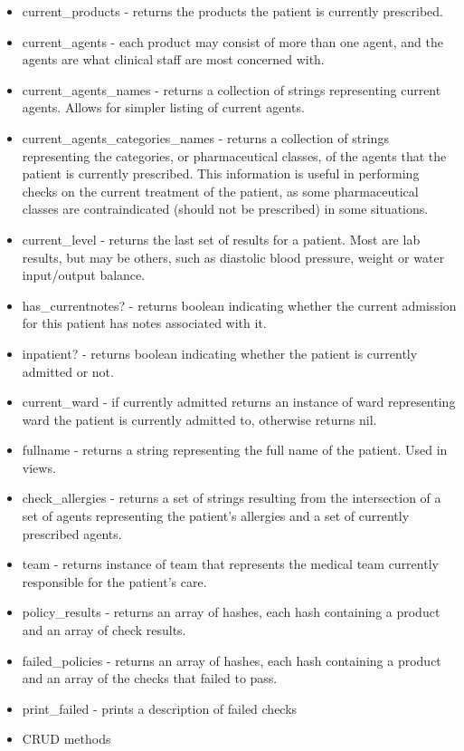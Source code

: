 \documentclass[letterpaper]{amsart}
\begin{document}
\begin{itemize}
    \item current\_products - returns the products the patient is currently prescribed. 
    \item current\_agents  - each product may consist of more than one agent, and the agents are what clinical staff are most concerned with.
    \item current\_agents\_names - returns a collection of strings representing current agents.  Allows for simpler listing of current agents. 
    \item current\_agents\_categories\_names - returns a collection of strings representing the categories, or pharmaceutical classes, of the agents that the patient is currently prescribed.  This information is useful in performing checks on the current treatment of the patient, as some pharmaceutical classes are contraindicated (should not be prescribed) in some situations. 
    \item current\_level - returns the last set of results for a patient.  Most are lab results, but may be others, such as diastolic blood pressure, weight or water input/output balance. 
    \item has\_currentnotes? - returns boolean indicating whether the current admission for this patient has notes associated with it. 
    \item inpatient? - returns boolean indicating whether the patient is currently admitted or not. 
    \item current\_ward - if currently admitted returns an instance of ward representing ward the patient is currently admitted to, otherwise returns nil. 
    \item fullname - returns a string representing the full name of the patient.  Used in views. 
    \item check\_allergies - returns a set of strings resulting from the intersection of a set of agents representing the patient's allergies and a set of currently prescribed agents.
    \item team - returns instance of team that represents the medical team currently responsible for the patient's care. 
    \item policy\_results - returns an array of hashes, each hash containing a product and an array of check results. 
    \item failed\_policies - returns an array of hashes, each hash containing a product and an array of the checks that failed to pass. 
    \item print\_failed - prints a description of failed checks 
    \item CRUD methods
\end{itemize}
\end{document}

